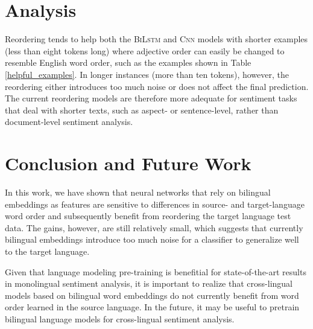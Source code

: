 \documentclass[a4paper,11pt,twocolumn,twoside]{article}
\newcommand{\bilstm}{\textsc{BiLstm}\xspace}
\newcommand{\cnn}{\textsc{Cnn}\xspace}
\begin{document}
\section{Analysis}

Reordering tends to help both the \bilstm and \cnn models with shorter examples (less than eight tokens long) where adjective order can easily be changed to resemble English word order, such as the examples shown in Table \ref{helpful_examples}. In longer instances (more than ten tokens), however, the reordering either introduces too much noise or does not affect the final prediction. The current reordering models are therefore more adequate for sentiment tasks that deal with shorter texts, such as aspect- or sentence-level, rather than document-level sentiment analysis.


\section{Conclusion and Future Work}

In this work, we have shown that neural networks that rely on bilingual embeddings as features
are sensitive to differences in source- and target-language word order and subsequently benefit from reordering the target language test data. The gains, however, are still relatively small, which suggests that currently bilingual embeddings introduce too much noise for a classifier to generalize well to the target language.

Given that language modeling pre-training is benefitial for state-of-the-art results in monolingual sentiment analysis, it is important to realize that cross-lingual models based on bilingual word embeddings do not currently benefit from word order learned in the source language. In the future, it may be useful to pretrain bilingual language models for cross-lingual sentiment analysis.





\end{document}
